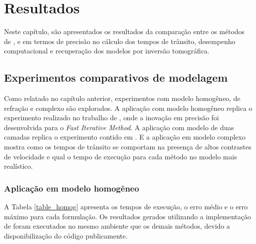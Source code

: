 \chapter{Resultados}
\label{ch:resultados}

Neste capítulo, são apresentados os resultados da comparação entre os métodos de ,  e  em termos de precisão no cálculo dos tempos de trânsito, desempenho computacional e recuperação dos modelos por inversão tomográfica. 

\section{Experimentos comparativos de modelagem}

Como relatado no capítulo anterior, experimentos com modelo homogêneo, de refração e complexo são explorados. A aplicação com modelo homogêneo replica o experimento realizado no trabalho de , onde a inovação em precisão foi desenvolvida para o \textit{Fast Iterative Method}. A aplicação com modelo de duas camadas replica o experimento contido em . E a aplicação em modelo complexo mostra como os tempos de trânsito se comportam na presença de altos contrastes de velocidade e qual o tempo de execução para cada método no modelo mais realístico.    

\subsection{Aplicação em modelo homogêneo}

A Tabela \ref{table_homog} apresenta os tempos de execução, o erro médio e o erro máximo para cada formulação. Os resultados gerados utilizando a implementação de  foram executados no mesmo ambiente que os demais métodos, devido a disponibilização do código publicamente.   

